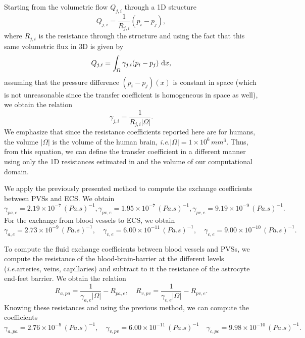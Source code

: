 \documentclass[a4paper,11pt]{article}
\newcommand{\ie}{\emph{i.e.}\;}
\newcommand{\1}{^{(1)}}
\newcommand{\2}{^{(2)}}
\newcommand*{\dd}{\mathop{\kern0pt\mathrm{d}}\!{}}
\newcommand{\abs}[1]{\left\lvert#1\right\rvert}
\begin{document}
Starting from the volumetric flow $Q_{j, i}$ through a 1D structure 
\[
    Q_{j, i} = \frac{1}{R_{j, i}}(p_i-p_j),
\]
where $R_{j, i}$ is the resistance through the structure and using the fact that this same volumetric flux in 3D is given by 
\[
    Q_{j, i} = \int_\Omega \gamma_{j , i}(p_i-p_j)\, \dd x,
\]
assuming that the pressure difference $(p_i-p_j)(x)$ is constant in space (which is not unreasonable since the transfer coefficient is homogeneous in space as well), we obtain the relation 
\[
    \gamma_{j , i } = \frac{1}{R_{j , i } \abs{\Omega}}.
\]
We emphasize that since the resistance coefficients reported here are for humans, the volume $\abs{\Omega}$ is the volume of the human brain, \ie $\abs{\Omega} = 1\times 10^{6}\, \si{mm^3}$. 
Thus, from this equation, we can define the transfer coefficient in a different manner using only the 1D resistances estimated in \cite{Vinje-2020-ICP} and the volume of our computational domain.  

We apply the previously presented method to compute the exchange coefficients between PVSs and ECS. We obtain 
\[
    \gamma_{pa,e } = 2.19 \times 10^{-7}\,  \si{(Pa.s)^{-1}}, \gamma_{pv,e} = 1.95 \times 10^{-7} \, \si{(Pa.s)^{-1}}, \gamma_{pc,e} = 9.19 \times 10^{-9} \, \si{(Pa.s)^{-1}}. 
\]
For the exchange from blood vessels to ECS, we obtain
\[
    \gamma_{a,e} = 2.73 \times 10^{-9} \, \si{(Pa.s)^{-1}},\quad \gamma_{v,e} = 6.00 \times 10^{-11} \, \si{(Pa.s)^{-1}}, \quad  \gamma_{c,e} = 9.00 \times 10^{-10} \, \si{(Pa.s)^{-1}}.
\]


To compute the fluid exchange coefficients between blood vessels and PVSs, we compute the resistance of the blood-brain-barrier at the different levels (\ie arteries, veins, capillaries) and subtract to it the resistance of the astrocyte end-feet barrier. We obtain the relation 
\[
    R_{a,pa} = \frac{1}{\gamma_{a,e}\abs{\Omega}} - R_{pa,e},\quad R_{v,pv} = \frac{1}{\gamma_{v,e}\abs{\Omega}} - R_{pv,e}.
\]
Knowing these resistances and using the previous method, we can compute the coefficients 
\[
\gamma_{a,pa} = 2.76 \times 10^{-9} \, \si{(Pa.s)^{-1}}, \quad \gamma_{v,pv} = 6.00 \times 10^{-11}  \, \si{(Pa.s)^{-1}}\quad \gamma_{c,pc} = 9.98 \times 10^{-10}\, \si{(Pa.s)^{-1}}. 
\]

%     
\end{document}
